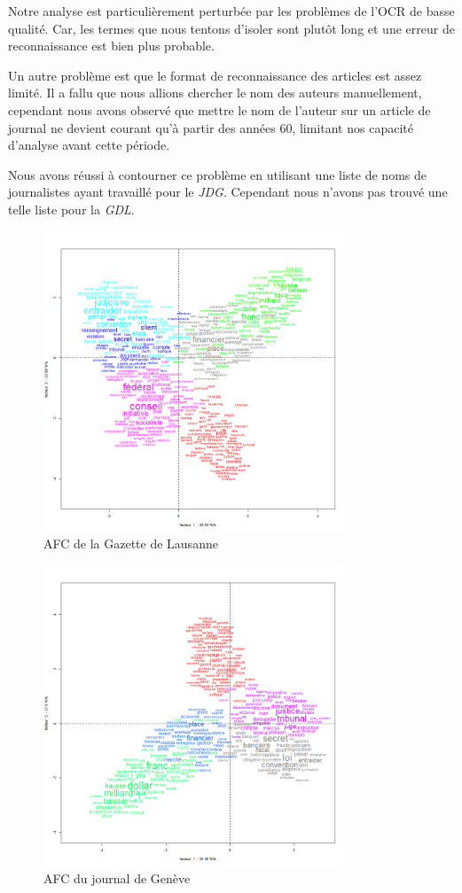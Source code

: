 \documentclass[11pt]{article}
\begin{document}
Notre analyse est particulièrement perturbée par les problèmes de l'OCR
de basse qualité. Car, les termes que nous tentons d'isoler sont plutôt
long et une erreur de reconnaissance est bien plus probable.

Un autre problème est que le format de reconnaissance des articles est
assez limité. Il a fallu que nous allions chercher le nom des auteurs
manuellement, cependant nous avons observé que mettre le nom de l'auteur
sur un article de journal ne devient courant qu'à partir des années 60,
limitant nos capacité d'analyse avant cette période.

Nous avons réussi à contourner ce problème en utilisant une liste de
noms de journalistes ayant travaillé pour le \emph{JDG}. Cependant nous
n'avons pas trouvé une telle liste pour la \emph{GDL}.

\begin{figure}
\centering
\includegraphics[width=0.8\textwidth ]{methodology/AFC2DL_GDL.png}
\caption{AFC de la Gazette de Lausanne}
\end{figure}

\begin{figure}
\centering
\includegraphics[width=0.8\textwidth ]{methodology/AFC2DL_JDG.png}
\caption{AFC du journal de Genève}
\end{figure}
\end{document}
